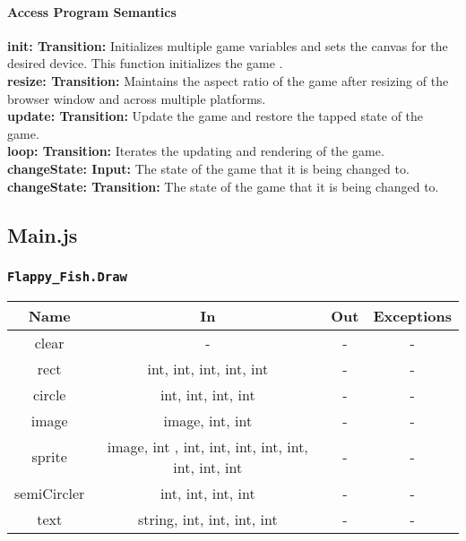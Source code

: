 \documentclass[11pt, oneside]{article}   	%
\begin{document}
\paragraph{Access Program Semantics} 
 \textbf{init: Transition: } Initializes multiple game variables and sets the canvas for the desired device.     This function initializes the game .\\
 \textbf{resize: Transition:} Maintains the aspect ratio of the game after resizing of the browser window and across multiple platforms.\\
  \textbf{update: Transition:} Update the game and restore the tapped state of the game.\\
   \textbf{loop: Transition:} Iterates the updating and rendering of the game. \\
    \textbf{changeState: Input:} The state of the game that it is being changed to. \\
    \textbf{changeState: Transition:} The state of the game that it is being changed to. \\

 
 
\subsection{Main.js}
\subsubsection{\texttt{Flappy\_Fish.Draw}}




\begin{center}
\begin{tabular}{ |c|c|c|c| } 
 \hline
 Name & In & Out & Exceptions \\ 
 \hline \hline
 clear & - & - & - \\ 
 rect & int, int, int, int, int & - & - \\ 
 circle & int, int, int, int & - & - \\ 
 image & image, int, int & - & - \\ 
 sprite & image, int , int, int, int, int, int, int, int, int & - & - \\ 
 semiCircler & int, int, int, int & - & - \\ 
 text & string, int, int, int, int & - & - \\ 
 \hline
\end{tabular}
\end{center}
\end{document}
